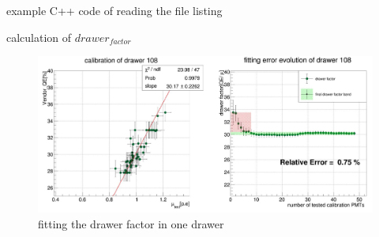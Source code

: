 %
\begin{frame}{example C++ code of reading the file}
listing
\end{frame}
\begin{frame}{calculation of $drawer_{factor}$}
\begin{figure}
\centering
\includegraphics[width=\textwidth]{figures/mucal.JPG} %
\caption{fitting the drawer factor in one drawer}
\end{figure}
\end{frame}
